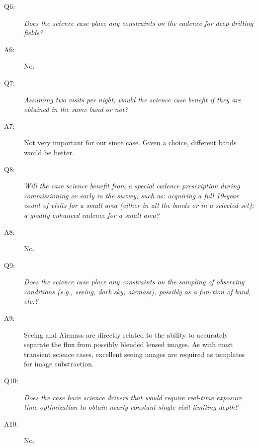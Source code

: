 \begin{description}
\item[Q6:] {\it Does the science case place any constraints on the
cadence for deep drilling fields?}

\item[A6:] No.

\item[Q7:] {\it Assuming two visits per night, would the science case
benefit if they are obtained in the same band or not?}

\item[A7:] Not very important for our since case. Given a choice, different bands would be better.

\item[Q8:] {\it Will the case science benefit from a special cadence
prescription during commissioning or early in the survey, such as:
acquiring a full 10-year count of visits for a small area (either in all
the bands or in a  selected set); a greatly enhanced cadence for a small
area?}

\item[A8:] No.

\item[Q9:] {\it Does the science case place any constraints on the
sampling of observing conditions (e.g., seeing, dark sky, airmass),
possibly as a function of band, etc.?}

\item[A9:] Seeing and Airmass are directly related to the ability to
accurately separate the flux from possibly blended lensed images. As
with most transient science cases, excellent seeing images are required
as templates for image substraction.

\item[Q10:] {\it Does the case have science drivers that would require
real-time exposure time optimization to obtain nearly constant
single-visit limiting depth?}

\item[A10:] No.

\end{description}


%
%
%
%

\navigationbar
